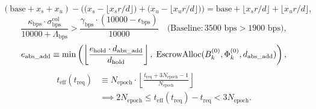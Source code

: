 \documentclass[runningheads,a4paper]{llncs}
\renewcommand{\_}{\textunderscore\allowbreak}
\begin{document}
\begin{equation}
\label{eq:release_sym_id}
(\text{base} + x_s + x_u) - \Big(\big(x_s - \lfloor x_s r / d \rfloor\big) + \big(x_u - \lfloor x_u r / d \rfloor\big)\Big) = \text{base} + \lfloor x_s r / d \rfloor + \lfloor x_u r / d \rfloor,
\end{equation}
\begin{equation}
\label{eq:griefing_constraint}
\frac{\kappa_{\text{bps}} \cdot \sigma_{\text{bps}}^{\text{col}}}{10000 + \Lambda_{\text{bps}}} > \frac{\gamma_{\text{bps}} \cdot (10000 - \epsilon_{\text{bps}})}{10000} \quad \Big(\text{Baseline}: 3500\text{ bps} > 1900\text{ bps}\Big),
\end{equation}
\begin{equation}
\label{eq:hold_absorb}
e_{\text{abs\_add}} \equiv \min\left(\left\lfloor \frac{e_{\text{hold}} \cdot d_{\text{abs\_add}}}{d_{\text{hold}}} \right\rfloor, \; \text{EscrowAlloc}(B_k^{(0)}, \Phi_k^{(0)}, d_{\text{abs\_add}})\right),
\end{equation}
\begin{equation}
\label{eq:t_eff}
\begin{aligned}
t_{\text{eff}}(t_{\text{req}}) &\equiv N_{\text{epoch}} \cdot \left\lfloor \frac{t_{\text{req}} + 3 N_{\text{epoch}} - 1}{N_{\text{epoch}}} \right\rfloor \\
&\implies 2 N_{\text{epoch}} \le t_{\text{eff}}(t_{\text{req}}) - t_{\text{req}} < 3 N_{\text{epoch}}.
\end{aligned}
\end{equation}
\end{document}
